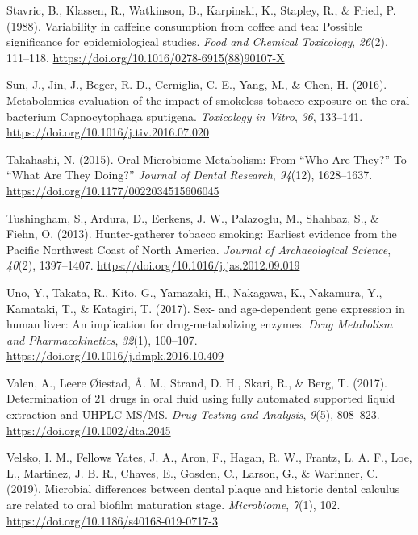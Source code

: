 \documentclass[
  b5paper,
]{book}
\newlength{\cslhangindent}
\newenvironment{CSLReferences}[2] %
 {\begin{list}{}{%
  \setlength{\itemindent}{0pt}
  \setlength{\leftmargin}{0pt}
  \setlength{\parsep}{0pt}
  \ifodd #1
   \setlength{\leftmargin}{\cslhangindent}
   \setlength{\itemindent}{-1\cslhangindent}
  \fi
  \setlength{\itemsep}{#2\baselineskip}}}
 {\end{list}}
\begin{document}
\begin{CSLReferences}{1}{0}
Stavric, B., Klassen, R., Watkinson, B., Karpinski, K., Stapley, R., \&
Fried, P. (1988). Variability in caffeine consumption from coffee and
tea: {Possible} significance for epidemiological studies. \emph{Food and
Chemical Toxicology}, \emph{26}(2), 111--118.
\url{https://doi.org/10.1016/0278-6915(88)90107-X}

Sun, J., Jin, J., Beger, R. D., Cerniglia, C. E., Yang, M., \& Chen, H.
(2016). Metabolomics evaluation of the impact of smokeless tobacco
exposure on the oral bacterium {Capnocytophaga} sputigena.
\emph{Toxicology in Vitro}, \emph{36}, 133--141.
\url{https://doi.org/10.1016/j.tiv.2016.07.020}

Takahashi, N. (2015). Oral {Microbiome Metabolism}: {From} {``{Who Are
They}?''} To {``{What Are They Doing}?''} \emph{Journal of Dental
Research}, \emph{94}(12), 1628--1637.
\url{https://doi.org/10.1177/0022034515606045}

Tushingham, S., Ardura, D., Eerkens, J. W., Palazoglu, M., Shahbaz, S.,
\& Fiehn, O. (2013). Hunter-gatherer tobacco smoking: Earliest evidence
from the {Pacific Northwest Coast} of {North America}. \emph{Journal of
Archaeological Science}, \emph{40}(2), 1397--1407.
\url{https://doi.org/10.1016/j.jas.2012.09.019}

Uno, Y., Takata, R., Kito, G., Yamazaki, H., Nakagawa, K., Nakamura, Y.,
Kamataki, T., \& Katagiri, T. (2017). Sex- and age-dependent gene
expression in human liver: {An} implication for drug-metabolizing
enzymes. \emph{Drug Metabolism and Pharmacokinetics}, \emph{32}(1),
100--107. \url{https://doi.org/10.1016/j.dmpk.2016.10.409}

Valen, A., Leere Øiestad, Å. M., Strand, D. H., Skari, R., \& Berg, T.
(2017). Determination of 21 drugs in oral fluid using fully automated
supported liquid extraction and {UHPLC-MS}/{MS}. \emph{Drug Testing and
Analysis}, \emph{9}(5), 808--823. \url{https://doi.org/10.1002/dta.2045}

Velsko, I. M., Fellows Yates, J. A., Aron, F., Hagan, R. W., Frantz, L.
A. F., Loe, L., Martinez, J. B. R., Chaves, E., Gosden, C., Larson, G.,
\& Warinner, C. (2019). Microbial differences between dental plaque and
historic dental calculus are related to oral biofilm maturation stage.
\emph{Microbiome}, \emph{7}(1), 102.
\url{https://doi.org/10.1186/s40168-019-0717-3}


\end{CSLReferences}
\end{document}
